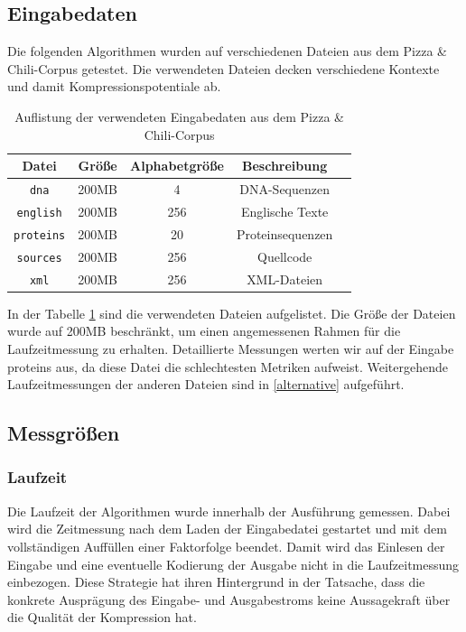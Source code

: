 \subsection{Eingabedaten}
Die folgenden Algorithmen wurden auf verschiedenen Dateien aus dem Pizza \& Chili-Corpus \cite{corpus} getestet. Die verwendeten Dateien decken verschiedene Kontexte und damit
Kompressionspotentiale ab.
\begin{table}[ht]
    \centering
    \caption{Auflistung der verwendeten Eingabedaten aus dem Pizza \& Chili-Corpus \cite{corpus}}
    \label{inputdata}
    \begin{tabular}{|c|c|c|c|c|}
        \hline
        \textbf{Datei} & \textbf{Größe} & \textbf{Alphabetgröße} & \textbf{Beschreibung} \\
        \hline
        \texttt{dna} & 200MB & 4 & DNA-Sequenzen \\
        \hline
        \texttt{english} & 200MB & 256 & Englische Texte \\
        \hline
        \texttt{proteins} & 200MB & 20 & Proteinsequenzen \\
        \hline
        \texttt{sources} & 200MB & 256 & Quellcode \\
        \hline
        \texttt{xml} & 200MB & 256 & XML-Dateien \\
        \hline
    \end{tabular}
\end{table}
In der Tabelle \ref{inputdata} sind die verwendeten Dateien aufgelistet. Die Größe der Dateien wurde auf 200MB beschränkt, um einen angemessenen Rahmen für die 
Laufzeitmessung zu erhalten. Detaillierte Messungen werten wir auf der Eingabe proteins aus, da diese Datei die schlechtesten Metriken aufweist. Weitergehende
Laufzeitmessungen der anderen Dateien sind in \ref{alternative} aufgeführt.

\subsection{Messgrößen}

\subsubsection{Laufzeit}
Die Laufzeit der Algorithmen wurde innerhalb der Ausführung gemessen. Dabei wird die Zeitmessung nach dem Laden der Eingabedatei gestartet und mit dem vollständigen
Auffüllen einer Faktorfolge beendet. Damit wird das Einlesen der Eingabe und eine eventuelle Kodierung der Ausgabe nicht in die Laufzeitmessung einbezogen. Diese Strategie
hat ihren Hintergrund in der Tatsache, dass die konkrete Ausprägung des Eingabe- und Ausgabestroms keine Aussagekraft über die Qualität der Kompression hat.

